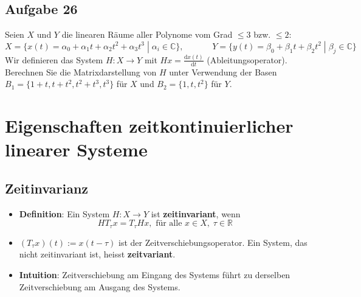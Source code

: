 \documentclass[11pt]{article}
\begin{document}
\pagebreak

\subsection*{Aufgabe 26}
\vspace*{-0.5cm}
Seien $X$ und $Y$ die linearen Räume aller Polynome vom Grad $\leq 3$ bzw. $\leq 2$:
$$X = \{ x(t) = \alpha_0 + \alpha_1 t + \alpha_2 t^2 + \alpha_3 t^3 \; | \; \alpha_i \in \mathbb{C} \}, \hspace{40pt} Y = \{ y(t) = \beta_0 + \beta_1 t + \beta_2 t^2 \; | \; \beta_j \in \mathbb{C} \}$$
Wir definieren das System $H:X \to Y$ mit $Hx = \frac{\text{d}x(t)}{\text{d}t}$ (Ableitungsoperator). Berechnen Sie die Matrixdarstellung von $H$ unter Verwendung der Basen $B_1 = \{ 1 + t, t + t^2, t^2 + t^3, t^3 \}$ für $X$ und $B_2 = \{ 1, t, t^2 \}$ für $Y$.\\

\vspace{-0.65cm}

\pagebreak

\section*{Eigenschaften zeitkontinuierlicher linearer Systeme}

\vspace*{-0.5cm}
\subsection*{Zeitinvarianz}
\vspace*{-0.5cm}
\begin{itemize}[leftmargin=0pt]
    \item[] \textbf{Definition}: Ein System $H:X \to Y$ ist \textbf{zeitinvariant}, wenn
    $$HT_\tau x = T_\tau Hx, \text{ für alle } x \in X, \; \tau \in \mathbb{R}$$
    \item[] $(T_\tau x)(t) := x(t-\tau)$ ist der Zeitverschiebungsoperator. Ein System, das nicht zeitinvariant ist, heisst \textbf{zeitvariant}.
    \item[] \textbf{Intuition}: Zeitverschiebung am Eingang des Systems führt zu derselben Zeitverschiebung am Ausgang des Systems.
\end{itemize}
\end{document}
